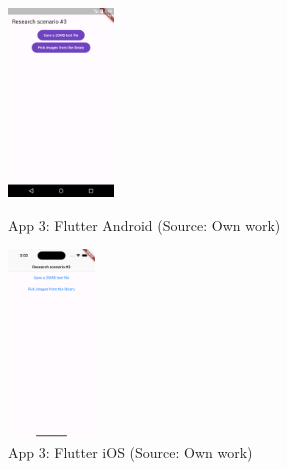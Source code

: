 \begin{figure}[H]
\begin{minipage}{.47\textwidth}
  \centering
  \includegraphics[height=50mm]{img/app3_flutter_android}
  \caption{App 3: Flutter Android (Source: Own work)}
  \label{fig:app3_flutter_android}
\end{minipage}
\hfill
\begin{minipage}{.47\textwidth}
  \centering
  \includegraphics[height=50mm]{img/app3_flutter_ios}
  \caption{App 3: Flutter iOS (Source: Own work)}
  \label{fig:app3_flutter_ios}
\end{minipage}
\end{figure}

